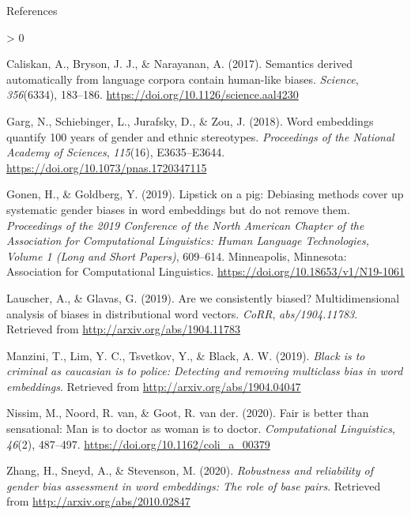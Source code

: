 \documentclass[
  10pt,
  ignorenonframetext,
  x11names, dvipsnames, bibspacing,natbib, table]{beamer}
\newlength{\cslhangindent}
\newenvironment{CSLReferences}[2] %
 {%
  \setlength{\parindent}{0pt}
  \ifodd #1 \everypar{\setlength{\hangindent}{\cslhangindent}}\ignorespaces\fi
  \ifnum #2 > 0
  \setlength{\parskip}{#2\baselineskip}
  \fi
 }%
 {}
\begin{document}
\begin{frame}{References}
\protect\hypertarget{references}{}
\tiny

\hypertarget{refs}{}
\begin{CSLReferences}{1}{0}
\leavevmode\hypertarget{ref-Caliskan2017semanticsBiases}{}%
Caliskan, A., Bryson, J. J., \& Narayanan, A. (2017). Semantics derived
automatically from language corpora contain human-like biases.
\emph{Science}, \emph{356}(6334), 183--186.
\url{https://doi.org/10.1126/science.aal4230}

\leavevmode\hypertarget{ref-Garg2018years}{}%
Garg, N., Schiebinger, L., Jurafsky, D., \& Zou, J. (2018). Word
embeddings quantify 100 years of gender and ethnic stereotypes.
\emph{Proceedings of the National Academy of Sciences}, \emph{115}(16),
E3635--E3644. \url{https://doi.org/10.1073/pnas.1720347115}

\leavevmode\hypertarget{ref-Gonen2019lipstick}{}%
Gonen, H., \& Goldberg, Y. (2019). Lipstick on a pig: {D}ebiasing
methods cover up systematic gender biases in word embeddings but do not
remove them. \emph{Proceedings of the 2019 Conference of the North
{A}merican Chapter of the Association for Computational Linguistics:
Human Language Technologies, Volume 1 (Long and Short Papers)},
609--614. Minneapolis, Minnesota: Association for Computational
Linguistics. \url{https://doi.org/10.18653/v1/N19-1061}

\leavevmode\hypertarget{ref-Lauscher2019multidimensional}{}%
Lauscher, A., \& Glavas, G. (2019). Are we consistently biased?
Multidimensional analysis of biases in distributional word vectors.
\emph{CoRR}, \emph{abs/1904.11783}. Retrieved from
\url{http://arxiv.org/abs/1904.11783}

\leavevmode\hypertarget{ref-Manzini2019blackToCriminal}{}%
Manzini, T., Lim, Y. C., Tsvetkov, Y., \& Black, A. W. (2019).
\emph{Black is to criminal as caucasian is to police: Detecting and
removing multiclass bias in word embeddings}. Retrieved from
\url{http://arxiv.org/abs/1904.04047}

\leavevmode\hypertarget{ref-Nissim2020fair}{}%
Nissim, M., Noord, R. van, \& Goot, R. van der. (2020). Fair is better
than sensational: Man is to doctor as woman is to doctor.
\emph{Computational Linguistics}, \emph{46}(2), 487--497.
\url{https://doi.org/10.1162/coli_a_00379}

\leavevmode\hypertarget{ref-zhang2020robustness}{}%
Zhang, H., Sneyd, A., \& Stevenson, M. (2020). \emph{Robustness and
reliability of gender bias assessment in word embeddings: The role of
base pairs}. Retrieved from \url{http://arxiv.org/abs/2010.02847}

\end{CSLReferences}
\end{frame}
\end{document}
